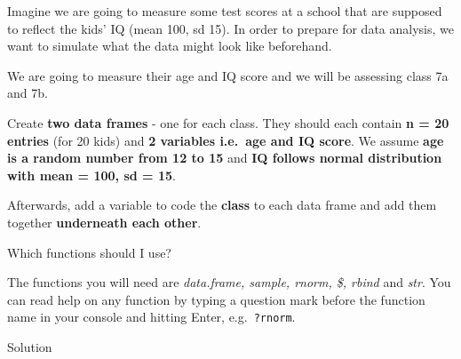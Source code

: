 \documentclass[
]{book}
\begin{document}
Imagine we are going to measure some test scores at a school that are supposed to reflect the kids' IQ (mean 100, sd 15).
In order to prepare for data analysis, we want to simulate what the data might look like beforehand.

We are going to measure their age and IQ score and we will be assessing class 7a and 7b.

Create \textbf{two data frames} - one for each class.
They should each contain \textbf{n = 20 entries} (for 20 kids) and \textbf{2 variables i.e.~age and IQ score}.
We assume \textbf{age is a random number from 12 to 15} and \textbf{IQ follows normal distribution with mean = 100, sd = 15}.

Afterwards, add a variable to code the \textbf{class} to each data frame and add them together \textbf{underneath each other}.

Which functions should I use?

The functions you will need are \emph{data.frame, sample, rnorm, \$, rbind} and \emph{str}.
You can read help on any function by typing a question mark before the function name in your console and hitting Enter, e.g.~\texttt{?rnorm}.

Solution
\end{document}
